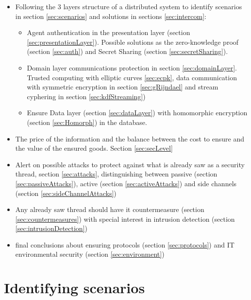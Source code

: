 \documentclass[10pt,a4paper,twoside]{llncs}
\begin{document}
\begin{itemize}
 \item Following the 3 layers structure of a distributed system \cite{TanenbaumDistr} to identify scenarios in section \ref{sec:scenarios} and solutions in sections \ref{sec:intercom}:
 \begin{itemize}
  \item Agent authentication in the presentation layer (section \ref{sec:presentationLayer}). Possible solutions as the zero-knowledge proof (section \ref{sec:auth}) and Secret Sharing (section \ref{sec:secretSharing}).
  \item Domain layer communications protection in section \ref{sec:domainLayer}. Trusted computing with elliptic curves \ref{sec:ecpk}, data communication with symmetric encryption in section \ref{sec:gRijndael} and stream cyphering in section \ref{sec:kdfStreaming})
  \item Ensure Data layer (section \ref{sec:dataLayer}) with homomorphic encryption (section \ref{sec:Homorph}) in the database.
 \end{itemize}
 \item The price of the information and the balance between the cost to ensure and the value of the ensured goods. Section \ref{sec:secLevel}
 \item Alert on possible attacks to protect against what is already saw as a security thread, section \ref{sec:attacks}, distinguishing between passive (section \ref{sec:passiveAttacks}), active (section \ref{sec:activeAttacks}) and side channels (section \ref{sec:sideChannelAttacks})
 \item Any already saw thread should have it countermeasure (section \ref{sec:countermeasures}) with special interest in intrusion detection (section \ref{sec:intrusionDetection})
 \item final conclusions about ensuring protocols (section \ref{sec:protocols}) and IT environmental security (section \ref{sec:environment})
\end{itemize}

%
\section{Identifying scenarios \label{sec:scenarios}}
\end{document}
